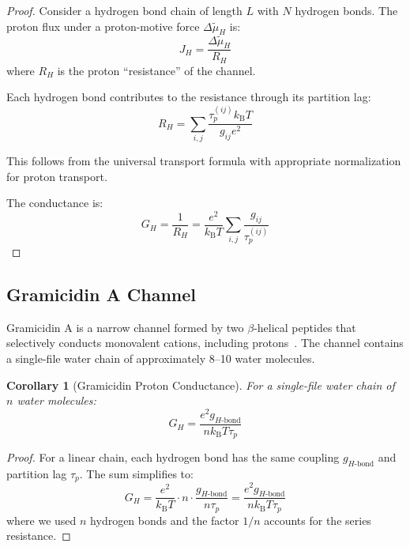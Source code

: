 \documentclass[twocolumn,showpacs,preprintnumbers,amsmath,amssymb,prd]{revtex4-2}
\newtheorem{corollary}[theorem]{Corollary}
\newcommand{\taup}{\tau_p}
\newcommand{\Hbond}{H\text{-bond}}
\newcommand{\kB}{k_{\text{B}}}
\begin{document}
\begin{proof}
Consider a hydrogen bond chain of length $L$ with $N$ hydrogen bonds. The proton flux under a proton-motive force $\Delta\tilde{\mu}_H$ is:
\begin{equation}
J_H = \frac{\Delta\tilde{\mu}_H}{R_H}
\label{eq:proton_flux}
\end{equation}
where $R_H$ is the proton ``resistance'' of the channel.

Each hydrogen bond contributes to the resistance through its partition lag:
\begin{equation}
R_H = \sum_{i,j} \frac{\taup^{(ij)} \kB T}{g_{ij} e^2}
\label{eq:proton_resistance}
\end{equation}

This follows from the universal transport formula with appropriate normalization for proton transport.

The conductance is:
\begin{equation}
G_H = \frac{1}{R_H} = \frac{e^2}{\kB T} \sum_{i,j} \frac{g_{ij}}{\taup^{(ij)}}
\end{equation}
\end{proof}

\subsection{Gramicidin A Channel}

Gramicidin A is a narrow channel formed by two $\beta$-helical peptides that selectively conducts monovalent cations, including protons~\cite{Hille2001}. The channel contains a single-file water chain of approximately 8--10 water molecules.

\begin{corollary}[Gramicidin Proton Conductance]
\label{cor:gramicidin}
For a single-file water chain of $n$ water molecules:
\begin{equation}
G_H = \frac{e^2 g_{\Hbond}}{n \kB T \taup}
\label{eq:gramicidin_conductance}
\end{equation}
\end{corollary}

\begin{proof}
For a linear chain, each hydrogen bond has the same coupling $g_{\Hbond}$ and partition lag $\taup$. The sum simplifies to:
\begin{equation}
G_H = \frac{e^2}{\kB T} \cdot n \cdot \frac{g_{\Hbond}}{n \taup} = \frac{e^2 g_{\Hbond}}{n \kB T \taup}
\end{equation}
where we used $n$ hydrogen bonds and the factor $1/n$ accounts for the series resistance.
\end{proof}
\end{document}
